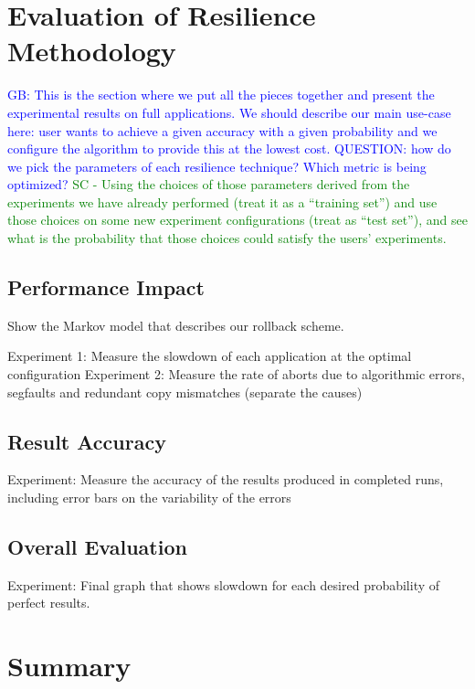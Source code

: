 \documentclass{sig-alternate}
\newcommand{\sui}[1]{%
  \textcolor{green}{SC - #1}
}
\newcommand{\greg}[1]{%
  \textcolor{blue}{GB: #1}
}
\begin{document}
\section{Evaluation of Resilience Methodology}
\label{sec:eval}

\greg{This is the section where we put all the pieces together and present the experimental results on full applications. We should describe our main use-case here: user wants to achieve a given accuracy with a given probability and we configure the algorithm to provide this at the lowest cost. QUESTION: how do we pick the parameters of each resilience technique? Which metric is being optimized?} \sui{Using the choices of those parameters derived from the experiments we have already performed (treat it as a ``training set'') and use those choices on some new experiment configurations (treat as ``test set''), and see what is the probability that those choices could satisfy the users' experiments.}

\subsection{Performance Impact}
\label{sec:eval:perf}

Show the Markov model that describes our rollback scheme.

Experiment 1: Measure the slowdown of each application at the optimal configuration
Experiment 2: Measure the rate of aborts due to algorithmic errors, segfaults and redundant copy mismatches (separate the causes)

\subsection{Result Accuracy}
\label{sec:eval:acc}

Experiment: Measure the accuracy of the results produced in completed runs, including error bars on the variability of the errors

\subsection{Overall Evaluation}
\label{sec:eval:overall}

Experiment: Final graph that shows slowdown for each desired probability of perfect results.

\section{Summary}
\label{sec:summary}



\end{document}
